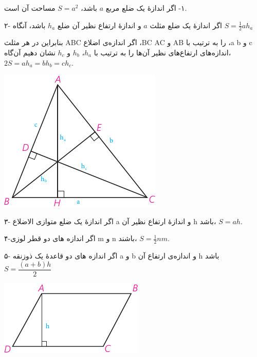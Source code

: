 \documentclass[12pt, a4paper]{book}
\begin{document}
\begin{minipage}{0.7\textwidth}
	١- اگر اندازهٔ یک ضلع مربع $a$ باشد، $S=a^2$ مساحت آن است.
	
	۲- اگر اندازهٔ یک ضلع مثلث $a$ و اندازهٔ ارتفاع نظیر آن ضلع $h_a$ باشد، آنگاه 
	$S=\frac12 ah_a$
	
	بنابراین در هر مثلث ABC اگر اندازه‌ی اضلاع ،BC AC و AB را به ترتیب با ،a b و c اندازه‌های ارتفاع‌های نظیر آن‌ها را به ترتیب با $h_a$، $h_b$ و $h_c$ نشان دهیم آن‌گاه، \\
 $2S = ah_a = bh_b = ch_c$.
	\end{minipage}
\begin{minipage}{0.3\textwidth}
\begin{flushleft}
		\includegraphics{"Shapes/Fasl - 3/Dars 2/P65-S1"}
\end{flushleft}
\end{minipage}

\begin{minipage}{0.7\textwidth}
۳- اگر اندازهٔ یک ضلع متوازی الاضلاع a و اندازهٔ ارتفاع نظیر آن h باشد، 
 $S=ah$.

۴-اگر اندازه های دو قطر لوزی m و n باشند، $S=\frac12 nm$.
	
۵- اگر اندازه های دو قاعدهٔ یک ذوزنقه a و b و اندازه‌ی ارتفاع آن h باشد\\
	 $S = \dfrac{(a+b)h}2$
\end{minipage}
\begin{minipage}{0.3\textwidth}
	\begin{flushleft}
		\includegraphics{"Shapes/Fasl - 3/Dars 2/P65-S2"}
	\end{flushleft}
\end{minipage}
\end{document}
